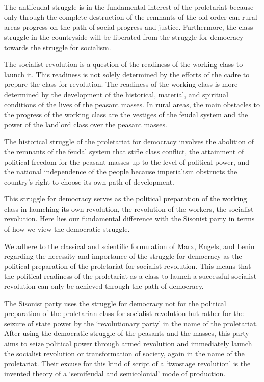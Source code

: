 \section{}
The antifeudal struggle is in the fundamental interest of the proletariat
because only through the complete destruction of the remnants of the old order 
can rural areas progress on the path of social progress and justice. 
Furthermore, the class struggle in the countryside will be liberated 
from the struggle for democracy towards the struggle for socialism.

The socialist revolution is a question of the readiness of the working class 
to launch it. 
This readiness is not solely determined by the efforts of the cadre 
to prepare the class for revolution. 
The readiness of the working class is more determined by the development 
of the historical, material, and spiritual conditions of the 
lives of the peasant masses. 
In rural areas, the main obstacles to the progress of the working class 
are the vestiges of the feudal system and the power of the landlord class 
over the peasant masses.

The historical struggle of the proletariat for democracy involves 
the abolition of the remnants of the feudal system that stifle class conflict, 
the attainment of political freedom for the peasant masses up to the level 
of political power, and the national independence of the people 
because imperialism obstructs the country's right to choose 
its own path of development.

This struggle for democracy serves as the political preparation of 
the working class in launching its own revolution, 
the revolution of the workers, the socialist revolution. 
Here lies our fundamental difference with the Sisonist party in terms of how 
we view the democratic struggle.

We adhere to the classical and scientific formulation 
of Marx, Engels, and Lenin regarding the necessity and importance of 
the struggle for democracy as the political preparation of the proletariat 
for socialist revolution. This means that the political readiness 
of the proletariat as a class to launch a successful socialist revolution 
can only be achieved through the path of democracy.

The Sisonist party uses the struggle for democracy not for 
the political preparation of the proletarian class for socialist revolution 
but rather for the seizure of state power by the `revolutionary party' 
in the name of the proletariat. After using the democratic struggle of the 
peasants and the masses, this party aims to seize political power through 
armed revolution and immediately launch the socialist revolution or 
transformation of society, again in the name of the proletariat. 
Their excuse for this kind of script of a `twostage revolution' 
is the invented theory of a `semifeudal and semicolonial' mode of production.

